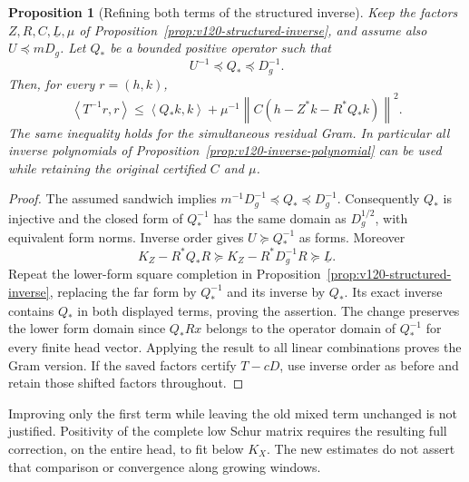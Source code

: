 \documentclass[11pt]{article}
\newtheorem{proposition}[theorem]{Proposition}
\theoremstyle{remark}
\newcommand{\norm}[1]{\left\lVert #1\right\rVert}
\newcommand{\ip}[2]{\left\langle #1,#2\right\rangle}
\begin{document}
\begin{proposition}[Refining both terms of the structured inverse]
\label{prop:v122-refined-structured}
Keep the factors $Z,R,C,\underline L,\mu$ of
Proposition~\ref{prop:v120-structured-inverse}, and assume also
$U\preceq mD_g$. Let $Q_*$ be a bounded positive operator such
that
\[
 U^{-1}\preceq Q_*\preceq D_g^{-1}.
\]
Then, for every $r=(h,k)$,
\begin{equation}\label{eq:v122-refined-structured}
 \ip{T^{-1}r}{r}
 \le\ip{Q_*k}{k}
       +\mu^{-1}\norm{C(h-Z^*k-R^*Q_*k)}^2.
\end{equation}
The same inequality holds for the simultaneous residual Gram.
In particular all inverse polynomials of
Proposition~\ref{prop:v120-inverse-polynomial} can be used while
retaining the original certified $C$ and $\mu$.
\end{proposition}
\begin{proof}
The assumed sandwich implies
$m^{-1}D_g^{-1}\preceq Q_*\preceq D_g^{-1}$.
Consequently $Q_*$ is injective and the closed form of $Q_*^{-1}$
has the same domain as $D_g^{1/2}$, with equivalent form norms.
Inverse order gives $U\succeq Q_*^{-1}$ as forms. Moreover
\[
 K_Z-R^*Q_*R\succeq K_Z-R^*D_g^{-1}R\succeq\underline L.
\]
Repeat the lower-form square completion in
Proposition~\ref{prop:v120-structured-inverse}, replacing the far
form by $Q_*^{-1}$ and its inverse by $Q_*$. Its exact inverse
contains $Q_*$ in both displayed terms, proving the assertion.
The change preserves the lower form domain since $Q_*Rx$ belongs
to the operator domain of $Q_*^{-1}$ for every finite head vector.
Applying the result to all linear combinations proves the Gram
version. If the saved factors certify $T-cD$, use inverse order
as before and retain those shifted factors throughout.
\end{proof}

Improving only the first term while leaving the old mixed term
unchanged is not justified. Positivity of the complete low Schur
matrix requires the resulting full correction, on the entire head,
to fit below $K_X$. The new estimates do not assert that comparison
or convergence along growing windows.
\end{document}
